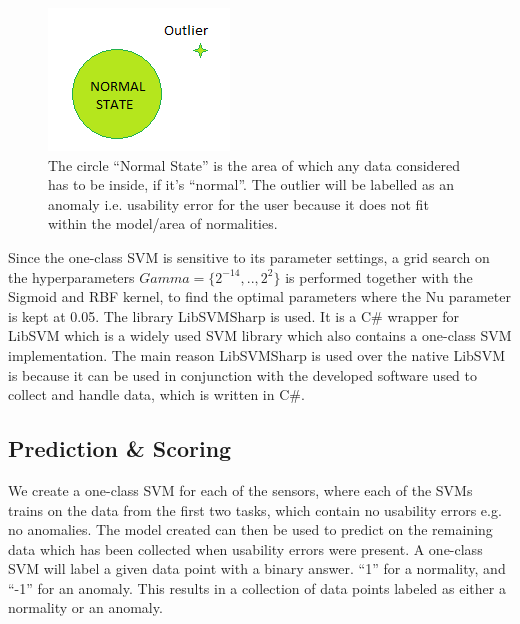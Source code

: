 \begin{figure}
    \centering
  \includegraphics[width=0.75\columnwidth]{graphics/oneclass-svm.png}
    \caption{The circle ``Normal State'' is the area of which any data considered has to be inside, if it's ``normal''. The outlier will be labelled as an anomaly i.e. usability error for the user because it does not fit within the model/area of normalities. }
    \label{[FIGURE] OneClass SVM}
\end{figure}

Since the one-class SVM is sensitive\cite{oneClassSVM} to its parameter settings, a grid search on the hyperparameters $Gamma = \{2^{-14},..,2^2\}$ is performed together with the Sigmoid and RBF kernel, to find the optimal parameters where the Nu parameter is kept at 0.05.
The library LibSVMSharp\cite{libsvmsharp} is used. It is a C\# wrapper for LibSVM\cite{libsvm} which is a widely used SVM library which also contains a one-class SVM implementation. The main reason LibSVMSharp is used over the native LibSVM is because it can be used in conjunction with the developed software used to collect and handle data, which is written in C\#.

\subsection{Prediction \& Scoring}
We create a one-class SVM for each of the sensors, where each of the SVMs trains on the data from the first two tasks, which contain no usability errors e.g. no anomalies. The model created can then be used to predict on the remaining data which has been collected when usability errors were present.
A one-class SVM will label a given data point with a binary answer. ``1'' for a normality, and ``-1'' for an anomaly.
This results in a collection of data points labeled as either a normality or an anomaly.

